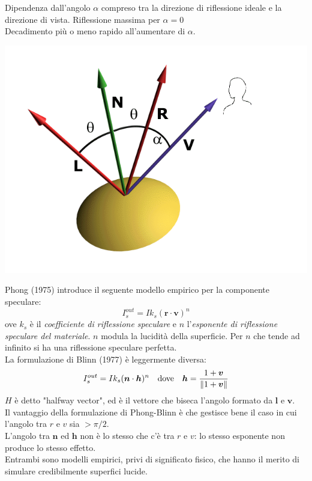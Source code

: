 \documentclass[a4paper, 10pt]{article}
\renewcommand{\vec}{\bm}
\begin{document}
			\begin{multicols}{2}
				
				Dipendenza dall’angolo $ \alpha $ compreso tra la direzione di
				riflessione ideale e la direzione di vista.
				Riflessione massima per $ \alpha = 0 $\\
				Decadimento più o meno rapido all’aumentare di $ \alpha $.\\
				
				\columnbreak
				
				\vspace*{-0.8cm}
				\includegraphics[scale=0.3]{speculare}
				
			\end{multicols}
			Phong (1975) introduce il seguente modello empirico per la
			componente speculare:
			\[
				I_s^{out} = Ik_s (\vec{r}\cdot\vec{v})^n
			\]
			ove $ k_s $ è il \textit{coefficiente di riflessione speculare}
			e $ n $ l’\textit{esponente di riflessione speculare del materiale}.
			$ n $ modula la lucidità della superficie. Per $ n $ che tende ad infinito si ha una
			riflessione speculare perfetta.\\
			La formulazione di Blinn (1977) è leggermente diversa:
			\[
				I_s^{out} = Ik_s(\vec{n}\cdot\vec{h})^n \quad \textup{dove} \quad 
				\vec{h} = \dfrac{1 + \vec{v}}{\| 1+\vec{v} \|}
			\]
			$ H $ è detto "halfway vector", ed è il vettore che biseca
			l’angolo formato da $ \vec{l} $ e $ \vec{v} $.\\
			Il vantaggio della formulazione di Phong-Blinn è che gestisce
			bene il caso in cui l’angolo tra $ r $ e $ v $ sia $ > \pi/2 $.\\
			L’angolo tra $ \vec{n} $ ed $ \vec{h} $ non è lo stesso che c’è tra $ r $ e $ v $: lo
			stesso esponente non produce lo stesso effetto.\\
			Entrambi sono modelli empirici, privi di significato fisico, che
			hanno il merito di simulare credibilmente superfici lucide.
			
\end{document}
